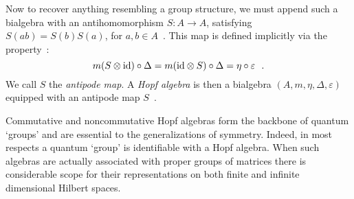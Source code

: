 \documentclass[12pt]{article}
\theoremstyle{plain}
\theoremstyle{definition}
\numberwithin{equation}{section}
\newcommand{\ID}{{\rm id}}
\newcommand{\vep}{\varepsilon}
\newcommand{\med}{\medbreak}
\newcommand{\lra}{{\longrightarrow}}
\begin{document}
\med
Now to recover anything resembling a group structure, we must
append such a bialgebra with an antihomomorphism $S : A \lra A$,
satisfying $S(ab) = S(b) S(a)$, for $a,b \in A$~. This map is
defined implicitly via the property~:
\begin{equation} m(S \otimes
\ID) \circ \Delta = m(\ID \otimes S) \circ \Delta = \eta \circ
\vep~~.
\end{equation}
We call $S$ the \emph{antipode map}. A \emph{Hopf algebra} is then
a bialgebra $(A,m, \eta, \Delta, \vep)$ equipped with an antipode
map $S$~.

\med
Commutative and noncommutative Hopf algebras form the backbone of
quantum `groups' and are essential to the generalizations of
symmetry. Indeed, in most respects a quantum `group' is identifiable
with a Hopf algebra. When such algebras are actually
associated with proper groups of matrices there is
considerable scope for their representations on both finite
and infinite dimensional Hilbert spaces.
\end{document}

